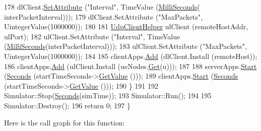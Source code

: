 \begin{DoxyCode}
178       dlClient.\hyperlink{classns3_1_1UdpClientHelper_a8bbae16a28f85ab3f3b5aa4642edfeae}{SetAttribute} (\textcolor{stringliteral}{"Interval"}, TimeValue (\hyperlink{group__timecivil_gaf26127cf4571146b83a92ee18679c7a9}{MilliSeconds}(
      interPacketInterval)));
179       dlClient.SetAttribute (\textcolor{stringliteral}{"MaxPackets"}, UintegerValue(1000000));
180 
181       \hyperlink{classns3_1_1UdpClientHelper}{UdpClientHelper} ulClient (remoteHostAddr, ulPort);
182       ulClient.SetAttribute (\textcolor{stringliteral}{"Interval"}, TimeValue (\hyperlink{group__timecivil_gaf26127cf4571146b83a92ee18679c7a9}{MilliSeconds}(interPacketInterval)));
183       ulClient.SetAttribute (\textcolor{stringliteral}{"MaxPackets"}, UintegerValue(1000000));
184 
185       clientApps.\hyperlink{classns3_1_1ApplicationContainer_ad09ab1a1ad5849d518d5f4c262e38152}{Add} (dlClient.Install (remoteHost));
186       clientApps.\hyperlink{classns3_1_1ApplicationContainer_ad09ab1a1ad5849d518d5f4c262e38152}{Add} (ulClient.Install (ueNodes.\hyperlink{classns3_1_1NodeContainer_a9ed96e2ecc22e0f5a3d4842eb9bf90bf}{Get}(u)));
187 
188       serverApps.\hyperlink{classns3_1_1ApplicationContainer_a8eff87926507020bbe3e1390358a54a7}{Start} (\hyperlink{group__timecivil_ga33c34b816f8ff6628e33d5c8e9713b9e}{Seconds} (startTimeSeconds->\hyperlink{classns3_1_1UniformRandomVariable_a03822d8c86ac51e9aa83bbc73041386b}{GetValue} ()));
189       clientApps.\hyperlink{classns3_1_1ApplicationContainer_a8eff87926507020bbe3e1390358a54a7}{Start} (\hyperlink{group__timecivil_ga33c34b816f8ff6628e33d5c8e9713b9e}{Seconds} (startTimeSeconds->\hyperlink{classns3_1_1UniformRandomVariable_a03822d8c86ac51e9aa83bbc73041386b}{GetValue} ()));  
190     \}
191 
192   Simulator::Stop(\hyperlink{group__timecivil_ga33c34b816f8ff6628e33d5c8e9713b9e}{Seconds}(simTime));
193   Simulator::Run();
194 
195   Simulator::Destroy();
196   \textcolor{keywordflow}{return} 0;
197 \}
\end{DoxyCode}


Here is the call graph for this function\+:


